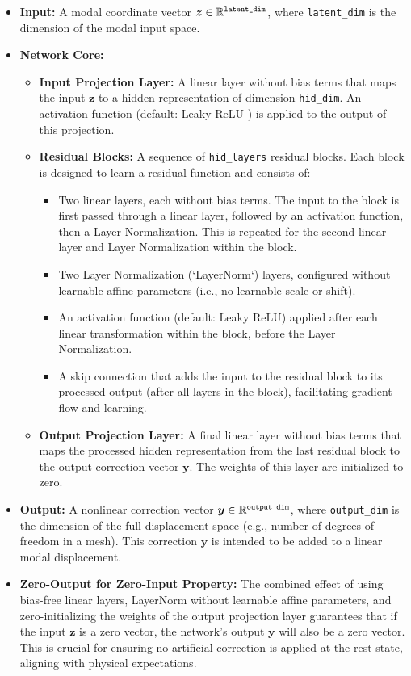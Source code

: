 \begin{itemize}
    \item \textbf{Input:} A modal coordinate vector \( \bm{z} \in \mathbb{R}^{\text{\texttt{latent\_dim}}} \), where \texttt{latent\_dim} is the dimension of the modal input space.
    \item \textbf{Network Core:}
    \begin{itemize}
        \item \textbf{Input Projection Layer:} A linear layer without bias terms that maps the input \( \bm{z} \) to a hidden representation of dimension \texttt{hid\_dim}. An activation function (default: Leaky ReLU \cite{xu2015empiricalevaluationrectifiedactivations}) is applied to the output of this projection.
        \item \textbf{Residual Blocks:} A sequence of \texttt{hid\_layers} residual blocks. Each block is designed to learn a residual function and consists of:
        \begin{itemize}
            \item Two linear layers, each without bias terms. The input to the block is first passed through a linear layer, followed by an activation function, then a Layer Normalization. This is repeated for the second linear layer and Layer Normalization within the block.
            \item Two Layer Normalization (`LayerNorm`) layers, configured without learnable affine parameters (i.e., no learnable scale or shift).
            \item An activation function (default: Leaky ReLU) applied after each linear transformation within the block, before the Layer Normalization.
            \item A skip connection that adds the input to the residual block to its processed output (after all layers in the block), facilitating gradient flow and learning.
        \end{itemize}
        \item \textbf{Output Projection Layer:} A final linear layer without bias terms that maps the processed hidden representation from the last residual block to the output correction vector \( \bm{y} \). The weights of this layer are initialized to zero.
    \end{itemize}
    \item \textbf{Output:} A nonlinear correction vector \( \bm{y} \in \mathbb{R}^{\text{\texttt{output\_dim}}} \), where \texttt{output\_dim} is the dimension of the full displacement space (e.g., number of degrees of freedom in a mesh). This correction \( \bm{y} \) is intended to be added to a linear modal displacement.
    \item \textbf{Zero-Output for Zero-Input Property:} The combined effect of using bias-free linear layers, LayerNorm without learnable affine parameters, and zero-initializing the weights of the output projection layer guarantees that if the input \( \bm{z} \) is a zero vector, the network's output \( \bm{y} \) will also be a zero vector. This is crucial for ensuring no artificial correction is applied at the rest state, aligning with physical expectations.
\end{itemize}

